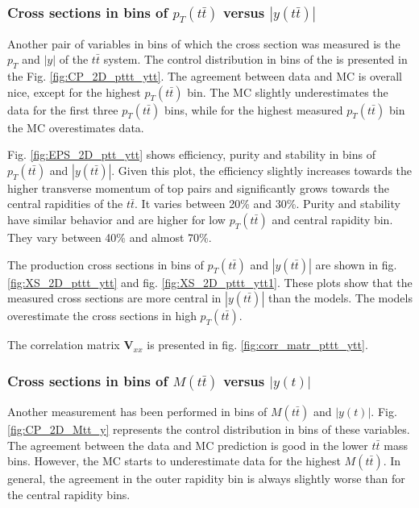 
\subsubsection{Cross sections in bins of $p_{T}(t\bar{t})$ versus $|y(t\bar{t})|$}

Another pair of variables in bins of which the cross section was measured is the $p_{T}$ and $|y|$ of the $t\bar{t}$ system. 
The control distribution in bins of the is presented in the Fig. \ref{fig:CP_2D_pttt_ytt}. The agreement between data and MC is overall nice, 
except for the highest $p_{T}(t\bar{t})$ bin. The MC slightly underestimates the data for the first three $p_{T}(t\bar{t})$ bins, while
for the highest measured $p_{T}(t\bar{t})$ bin the MC overestimates data. 

Fig. \ref{fig:EPS_2D_ptt_ytt} shows efficiency, purity and stability in bins of $p_{T}(t\bar{t})$ and $|y(t\bar{t})|$. Given this plot, the efficiency
slightly increases towards the higher transverse momentum of top pairs and significantly grows towards the central rapidities of the $t\bar{t}$. It varies
between 20\% and 30\%. Purity
and stability have similar behavior and are higher for low $p_{T}(t\bar{t})$ and central rapidity bin. They vary between 40\% and almost 70\%.

The production cross sections in bins of $p_{T}(t\bar{t})$ and $|y(t\bar{t})|$ are shown in fig. \ref{fig:XS_2D_pttt_ytt} and fig. \ref{fig:XS_2D_pttt_ytt1}.
These plots show that the measured cross sections are more central in $|y(t\bar{t})|$ than the models. The models overestimate the cross
sections in high $p_{T}(t\bar{t})$.

The correlation matrix $\mathbf{V}_{xx}$ is presented in fig. \ref{fig:corr_matr_pttt_ytt}.


\subsubsection{Cross sections in bins of $M(t\bar{t})$ versus $|y(t)|$}

Another measurement has been performed in bins of $M(t\bar{t})$ and $|y(t)|$. Fig. \ref{fig:CP_2D_Mtt_y} represents the control distribution in bins of these variables.
The agreement between the data and MC prediction is good in the lower $t\bar{t}$ mass bins. However, the MC starts to underestimate data for the highest $M(t\bar{t})$.
In general, the agreement in the outer rapidity bin is always slightly worse than for the central rapidity bins.

